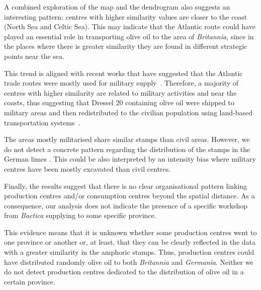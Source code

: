 \documentclass[review]{elsarticle}
\newcommand{\memo}[2]{\textcolor{#1}{#2}}
\newcommand{\xavi}[1]{\memo{magenta}{XRC: #1\\}}
\begin{document}
A combined exploration of the map and the dendrogram also suggests an interesting pattern: centres with higher similarity values are closer to the coast (North Sea and Celtic Sea). This may indicate that the Atlantic route could have played an essential role in transporting olive oil to the area of \textit{Britannia}, since in the places where there is greater similarity they are found in different strategic points near the sea.

This trend is aligned with recent works that have suggested that the Atlantic trade routes were mostly used for military supply~\citep{remesal_annona_1986,remesal_provincial_2008,carreras_atlantic_2012,morillo_hispania_2016,rubio-campillo_provincias_2018}. Therefore, a majority of centres with higher similarity are related to military activities and near the coasts, thus suggesting that Dressel 20 containing olive oil were shipped to military areas and then redistributed to the civilian population using land-based transportation systems~\citep{carreras_britannia_1998,ayllon_olive_2018}.


The areas mostly militarised share similar stamps than civil areas. However, we do not detect a concrete pattern regarding the distribution of the stamps in the German limes \citep{xanten2018}. This could be also interpreted by an intensity bias where military centres have been mostly excavated than civil centres.



Finally, the results suggest that there is no clear organisational pattern linking production centres and/or consumption centres beyond the spatial distance. As a consequence, our analysis does not indicate the presence of a specific workshop from \textit{Baetica} supplying to some specific province. 

This evidence means that it is unknown whether some production centres went to one province or another or, at least, that they can be clearly reflected in the data with a greater similarity in the amphoric stamps. Thus, production centres could have distributed randomly olive oil to both \textit{Britannia} and \textit{Germania}. Neither we do not detect production centres dedicated to the distribution of olive oil in a certain province. 
\end{document}
